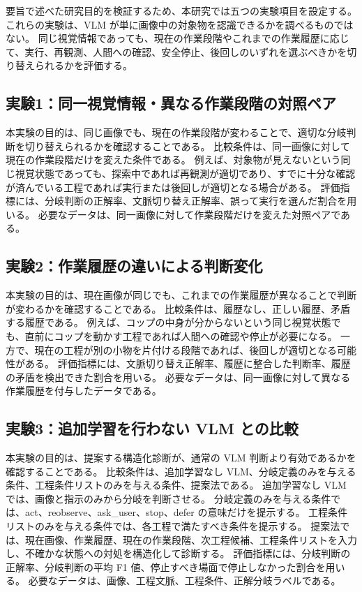 要旨で述べた研究目的を検証するため、本研究では五つの実験項目を設定する。
これらの実験は、VLM が単に画像中の対象物を認識できるかを調べるものではない。
同じ視覚情報であっても、現在の作業段階やこれまでの作業履歴に応じて、実行、再観測、人間への確認、安全停止、後回しのいずれを選ぶべきかを切り替えられるかを評価する。

\subsection{実験1：同一視覚情報・異なる作業段階の対照ペア}

本実験の目的は、同じ画像でも、現在の作業段階が変わることで、適切な分岐判断を切り替えられるかを確認することである。
比較条件は、同一画像に対して現在の作業段階だけを変えた条件である。
例えば、対象物が見えないという同じ視覚状態であっても、探索中であれば再観測が適切であり、すでに十分な確認が済んでいる工程であれば実行または後回しが適切となる場合がある。
評価指標には、分岐判断の正解率、文脈切り替え正解率、誤って実行を選んだ割合を用いる。
必要なデータは、同一画像に対して作業段階だけを変えた対照ペアである。

\subsection{実験2：作業履歴の違いによる判断変化}

本実験の目的は、現在画像が同じでも、これまでの作業履歴が異なることで判断が変わるかを確認することである。
比較条件は、履歴なし、正しい履歴、矛盾する履歴である。
例えば、コップの中身が分からないという同じ視覚状態でも、直前にコップを動かす工程であれば人間への確認や停止が必要になる。
一方で、現在の工程が別の小物を片付ける段階であれば、後回しが適切となる可能性がある。
評価指標には、文脈切り替え正解率、履歴に整合した判断率、履歴の矛盾を検出できた割合を用いる。
必要なデータは、同一画像に対して異なる作業履歴を付与したデータである。

\subsection{実験3：追加学習を行わない VLM との比較}

本実験の目的は、提案する構造化診断が、通常の VLM 判断より有効であるかを確認することである。
比較条件は、追加学習なし VLM、分岐定義のみを与える条件、工程条件リストのみを与える条件、提案法である。
追加学習なし VLM では、画像と指示のみから分岐を判断させる。
分岐定義のみを与える条件では、act、reobserve、ask\_user、stop、defer の意味だけを提示する。
工程条件リストのみを与える条件では、各工程で満たすべき条件を提示する。
提案法では、現在画像、作業履歴、現在の作業段階、次工程候補、工程条件リストを入力し、不確かな状態への対処を構造化して診断する。
評価指標には、分岐判断の正解率、分岐判断の平均 F1 値、停止すべき場面で停止しなかった割合を用いる。
必要なデータは、画像、工程文脈、工程条件、正解分岐ラベルである。

